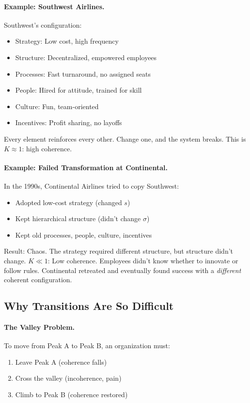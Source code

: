 \paragraph{Example: Southwest Airlines.}
Southwest's configuration:
\begin{itemize}
  \item Strategy: Low cost, high frequency
  \item Structure: Decentralized, empowered employees
  \item Processes: Fast turnaround, no assigned seats
  \item People: Hired for attitude, trained for skill
  \item Culture: Fun, team-oriented
  \item Incentives: Profit sharing, no layoffs
\end{itemize}

Every element reinforces every other. Change one, and the system breaks.
This is $K \approx 1$: high coherence.

\paragraph{Example: Failed Transformation at Continental.}
In the 1990s, Continental Airlines tried to copy Southwest:
\begin{itemize}
  \item Adopted low-cost strategy (changed $s$)
  \item Kept hierarchical structure (didn't change $\sigma$)
  \item Kept old processes, people, culture, incentives
\end{itemize}

Result: Chaos. The strategy required different structure, but structure didn't change.
$K \ll 1$: Low coherence. Employees didn't know whether to innovate or follow rules.
Continental retreated and eventually found success with a \emph{different} coherent configuration.

\subsection{Why Transitions Are So Difficult}

\paragraph{The Valley Problem.}
To move from Peak A to Peak B, an organization must:
\begin{enumerate}
  \item Leave Peak A (coherence falls)
  \item Cross the valley (incoherence, pain)
  \item Climb to Peak B (coherence restored)
\end{enumerate}

